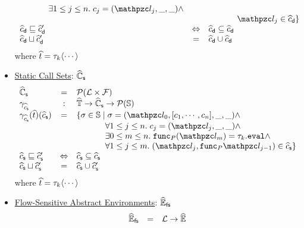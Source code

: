 \begin{itemize}
\[\begin{array}{lcl}
          \phantom{\{ \st \in \stset \mid}
          \exists 1 \leq j \leq n. \; \ctxt_j = (\lab_j, \_, \_) \wedge\\&&

          \phantom{\{ \st \in \stset \mid}
          \lab_j \in \adcall
        \}\\

        \adcall \order \adcall' &\Leftrightarrow&
        \adcall \subseteq \adcall\\

        \adcall \join \adcall' &=&
        \adcall \cup \adcall\\
      \end{array}
    \]
    where $\widehat{t} = \tau_k \langle \cdots \rangle$

  \item \underline{Static Call Sets}: $\widehat{\mathbb{C}}_{\textsf{s}}$
    \[
      \begin{array}{lcl}
        \ascallset &=& \powerset{\labset \times \funcset}\\

        \ascallgamma &:& \atreeset \rightarrow \ascallset \rightarrow
        \powerset{\stset}\\

        \ascallgamma(\atree)(\ascall) &=& \{ \st \in \stset \mid
          \st = (\lab_0, [\ctxt_1, \cdots, \ctxt_n], \_, \_) \wedge\\&&

          \phantom{\{ \st \in \stset \mid}
          \forall 1 \leq j \leq n. \; \ctxt_j = (\lab_j, \_, \_) \wedge\\&&

          \phantom{\{ \st \in \stset \mid}
          \exists 0 \leq m \leq n. \; \getfunc{\prog}(\lab_m) = \ty_k.\eval
          \wedge\\&&

          \phantom{\{ \st \in \stset \mid}
          \forall 1 \leq j \leq m. \; (\lab_j, \getfunc{\prog}{\lab_{j-1}}) \in
          \ascall
        \}\\

        \ascall \order \ascall' &\Leftrightarrow& \ascall \subseteq \ascall\\

        \ascall \join \ascall' &=& \ascall \cup \ascall'\\
      \end{array}
    \]
    where $\widehat{t} = \tau_k \langle \cdots \rangle$

  \item \underline{Flow-Sensitive Abstract Environments}: $\widehat{\mathbb{E}}_{\textsf{fs}}$
    \[
      \begin{array}{lcl}
        \widehat{\mathbb{E}}_{\textsf{fs}} &=& \mathcal{L} \rightarrow \widehat{\mathbb{E}}\\


\end{array}\]
\end{itemize}
